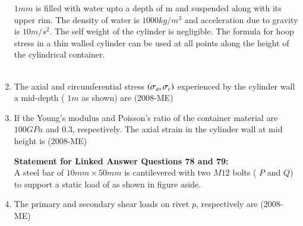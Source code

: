 \documentclass[journal]{IEEEtran}
\begin{document}
\begin{enumerate}
$1 mm$ is filled with water upto a depth of 
m and suspended along with its upper rim. The density of water is $1000kg/m^3$ and acceleration due to gravity is $10m/s^2$. The self weight of the cylinder is negligible. The formula for hoop stress in a thin walled cylinder can be used at all points along the height of the cylindrical container. \\
  \\
 \item The axial and circumferential stress $\left(\sigma_a, \sigma_c\right)$
 experienced by the cylinder wall a mid-depth (
 $1m$ as shown) are \hfill (2008-ME)
\begin{enumerate}
    \end{enumerate}
\item If the Young's modulus and Poisson's ratio of the container material are $100GPa$ and $0.3$, respectively. The axial strain in the cylinder wall at mid height is \hfill (2008-ME)
\begin{enumerate}
\end{enumerate}
\textbf{Statement for Linked Answer Questions 78 and 79:} \\
A steel bar of $10mm \times 50mm$
 is cantilevered with two $M12$
 bolts ( $P$ and $Q$) to support a static load of 
 as shown in figure aside.
 
 \item The primary and secondary shear loads on rivet $p$, 
 respectively are \hfill (2008-ME)
 \begin{enumerate}
\end{enumerate}
\end{enumerate}
\end{document}
